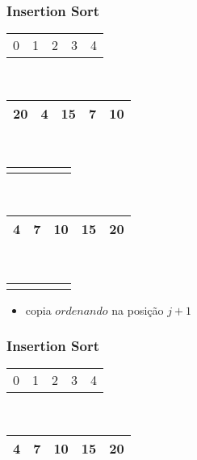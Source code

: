 \documentclass{beamer}
\begin{document}
\begin{frame}
    \frametitle{Insertion Sort}
    \begin{center}
        \begin{table}
            \begin{tabular}{p{0.25cm} p{0.25cm} p{0.25cm} p{0.25cm} p{0.25cm}}
                0 & 1 & 2 & 3 & 4
            \end{tabular} \\
            \begin{tabular}{| p{0.25cm} | p{0.25cm} | p{0.25cm} | p{0.25cm} | p{0.25cm} |}
                \hline
                20 & 4 & 15 & 7 & 10 \\ \hline
            \end{tabular} \\
            \begin{tabular}{p{0.25cm} p{0.25cm} p{0.25cm} p{0.25cm} p{0.25cm}}
                & & & & \color{green}{$\uparrow$}
            \end{tabular} \\
            \begin{tabular}{| p{0.25cm} | p{0.25cm} | p{0.25cm} | p{0.25cm} | p{0.25cm} |}
                \hline
                4 & 7 & 10 & 15 & 20\\ \hline
            \end{tabular} \\
            \begin{tabular}{p{0.25cm} p{0.25cm} p{0.25cm} p{0.25cm} p{0.25cm}}
                & & \color{blue}{$\uparrow$} & &
            \end{tabular}
        \end{table}
	\end{center}
    \color{green}{$ordenando = 10$}
    \begin{itemize}[<+->]
        \item copia $ordenando$ na posição $j + 1$
    \end{itemize}
\end{frame}

\begin{frame}
    \frametitle{Insertion Sort}
    \begin{center}
        \begin{table}
            \begin{tabular}{p{0.25cm} p{0.25cm} p{0.25cm} p{0.25cm} p{0.25cm}}
                0 & 1 & 2 & 3 & 4
            \end{tabular} \\
            \begin{tabular}{| p{0.25cm} | p{0.25cm} | p{0.25cm} | p{0.25cm} | p{0.25cm} |}
                \hline
                4 & 7 & 10 & 15 & 20 \\ \hline
            \end{tabular}
        \end{table}
	\end{center}
    \color{green}{Acabou! Vetor Auxiliar Ordenado!}
\end{frame}
\end{document}
